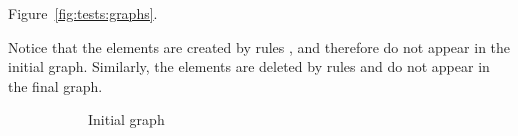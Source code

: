 \begin{example} Figure~\ref{fig:tests:graphs}.

  Notice that the elements  are created by rules , and therefore do not appear in the initial graph. Similarly, the elements  are deleted by rules  and do not appear in the final graph.

\begin{figure}[!ht]
  \centering
  \begin{subfigure}[t]{.5\textwidth}
    \centerline{}
    \caption{Initial graph}
  \end{subfigure}%
  \begin{subfigure}[t]{.5\textwidth}
    \centerline{}

\end{subfigure}
\end{figure}
\end{example}
